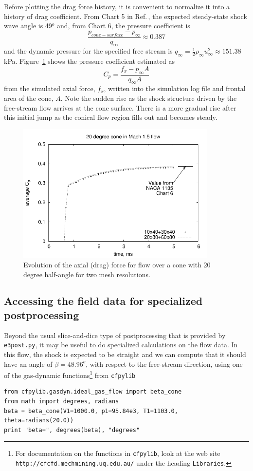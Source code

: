 \medskip
Before plotting the drag force history, 
it is convenient to normalize it into a history of drag coefficient.
From Chart 5 in Ref.\,\cite{ames_53}, the expected steady-state shock wave
angle is 49$^o$ and, from Chart 6, the pressure coefficient is
$$
\frac{p_{cone-surface} - p_{\infty}}{q_{\infty}} \approx 0.387
$$
and the dynamic pressure for the specified free stream is
$q_{\infty} = \frac{1}{2} \rho_{\infty} u_{\infty}^2 \approx 151.38$\,kPa.
Figure~\ref{cone20-axial-force-fig} shows the pressure coefficient 
estimated as
$$
C_p = \frac{f_x - p_{\infty} A}{q_{\infty} A}
$$
from the simulated axial force, $f_x$, written into the simulation log file
and frontal area of the cone, $A$.
Note the sudden rise as the shock structure driven by the free-stream flow
arrives at the cone surface.
There is a more gradual rise after this initial jump as the conical flow region
fills out and becomes steady.

\begin{figure}[htbp]
\begin{center}
\includegraphics[width=10cm]{../2D/cone20-simple/cone20_cp.pdf}
\end{center}
\caption{Evolution of the axial (drag) force
         for flow over a cone with 20 degree half-angle
	 for two mesh resolutions.}
\label{cone20-axial-force-fig}
\end{figure}

\subsection{Accessing the field data for specialized postprocessing}
%
Beyond the usual slice-and-dice type of postprocessing that is provided by \verb!e3post.py!, 
it may be useful to do specialized calculations on the flow data.
In this flow, the shock is expected to be straight and we can compute
that it should have an angle of $\beta = 48.96^o$, with respect to the free-stream direction,
using one of the gas-dynamic functions\footnote{For documentation on the functions in \texttt{cfpylib},
look at the web site \texttt{http://cfcfd.mechmining.uq.edu.au/} under the heading \texttt{Libraries}.} 
from \verb!cfpylib!
\begin{verbatim}
from cfpylib.gasdyn.ideal_gas_flow import beta_cone
from math import degrees, radians
beta = beta_cone(V1=1000.0, p1=95.84e3, T1=1103.0, theta=radians(20.0))
print "beta=", degrees(beta), "degrees"
\end{verbatim}

